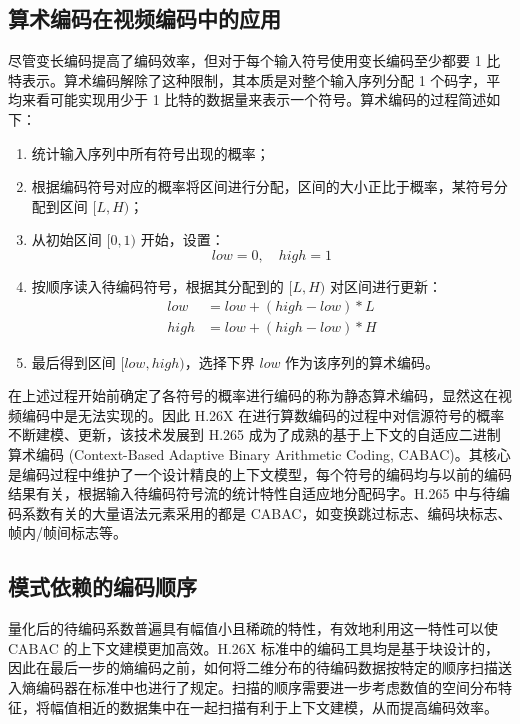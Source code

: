\subsection{算术编码在视频编码中的应用}
尽管变长编码提高了编码效率，但对于每个输入符号使用变长编码至少都要 1 比特表示。算术编码解除了这种限制，其本质是对整个输入序列分配 1 个码字，平均来看可能实现用少于 1 比特的数据量来表示一个符号。算术编码的过程简述如下：
\begin{enumerate}
    \item 统计输入序列中所有符号出现的概率；
    \item 根据编码符号对应的概率将区间进行分配，区间的大小正比于概率，某符号分配到区间 $[L, H)$；
    \item 从初始区间 $[0,1)$ 开始，设置：
          \begin{equation}
              low=0, \quad high=1 \nonumber
          \end{equation}
    \item 按顺序读入待编码符号，根据其分配到的 $[L, H)$ 对区间进行更新：
          \begin{equation}
              \begin{aligned}
                  low  & =low+(high-low)*L \\
                  high & =low+(high-low)*H
              \end{aligned} \nonumber
          \end{equation}
    \item 最后得到区间 $[low, high)$，选择下界 $low$ 作为该序列的算术编码。
\end{enumerate}

在上述过程开始前确定了各符号的概率进行编码的称为静态算术编码，显然这在视频编码中是无法实现的。因此 H.26X 在进行算数编码的过程中对信源符号的概率不断建模、更新，该技术发展到 H.265 成为了成熟的基于上下文的自适应二进制算术编码 (Context-Based Adaptive Binary Arithmetic Coding, CABAC)。其核心是编码过程中维护了一个设计精良的上下文模型，每个符号的编码均与以前的编码结果有关，根据输入待编码符号流的统计特性自适应地分配码字。H.265 中与待编码系数有关的大量语法元素采用的都是 CABAC，如变换跳过标志、编码块标志、帧内/帧间标志等。

\subsection{模式依赖的编码顺序}
量化后的待编码系数普遍具有幅值小且稀疏的特性，有效地利用这一特性可以使 CABAC 的上下文建模更加高效。H.26X 标准中的编码工具均是基于块设计的，因此在最后一步的熵编码之前，如何将二维分布的待编码数据按特定的顺序扫描送入熵编码器在标准中也进行了规定。扫描的顺序需要进一步考虑数值的空间分布特征，将幅值相近的数据集中在一起扫描有利于上下文建模，从而提高编码效率。

